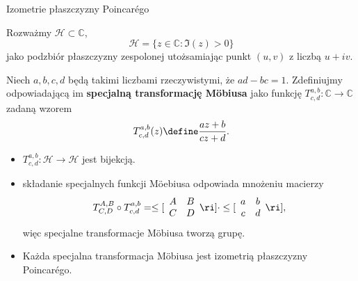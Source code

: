\begin{frame}{Izometrie płaszczyzny Poincar\'ego}

 Rozważmy $\mathcal{H}\subset \mathbb{C}$, \[\mathcal{H}=\{z\in \mathbb{C}\colon \Im(z)>0\}\]jako podzbiór płaszczyzny zespolonej utożsamiając punkt $(u,v)$ z liczbą $u+iv$. 

\pause\begin{definicja}
Niech $a,b,c,d$ będą takimi liczbami rzeczywistymi, że $ad-bc=1$. Zdefiniujmy odpowiadającą im \textbf{specjalną transformację M\"obiusa} jako funkcję 
$T^{a,b}_{c,d}\colon \mathbb{C}\to\mathbb{C}$ zadaną wzorem
\[T^{a,b}_{c,d}(z)\define \frac{az+b}{cz+d}.\]
\end{definicja}

\end{frame}
\begin{frame}[<+->]

\begin{twierdzenie}
\begin{itemize}
\item $T^{a,b}_{c,d}\colon \mathcal{H}\to\mathcal{H}$ jest bijekcją.
\item składanie specjalnych funkcji M\"oebiusa odpowiada mnożeniu macierzy 
\[T^{A,B}_{C,D}\circ T^{a,b}_{c,d}=
\le[\begin{array}{cc}
     A&B\\
	C&D
     \end{array}
\ri]\cdot
\le[\begin{array}{cc}
     a&b\\
	c&d
     \end{array}
\ri],\] więc specjalne transformacje M\"obiusa tworzą grupę.
\item Każda specjalna transformacja M\"obiusa jest izometrią płaszczyzny Poincar\'ego.
\end{itemize}
\end{twierdzenie}

\end{frame}
